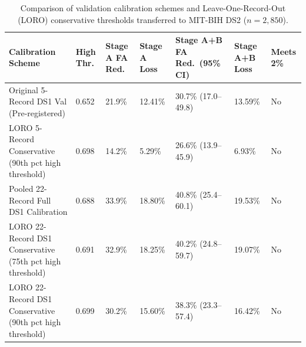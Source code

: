 \begin{table}[t]
\centering
\caption{Comparison of validation calibration schemes and Leave-One-Record-Out (LORO) conservative thresholds transferred to MIT-BIH DS2 ($n=2{,}850$).}
\label{tab:loro_calibration}
\begin{tabular}{lllllll}
\toprule
Calibration Scheme & High Thr. & Stage A FA Red. & Stage A Loss & Stage A+B FA Red.\ (95\% CI) & Stage A+B Loss & Meets 2\% \\
\midrule
Original 5-Record DS1 Val (Pre-registered) & 0.652 & 21.9\% & 12.41\% & 30.7\% (17.0--49.8) & 13.59\% & No \\
LORO 5-Record Conservative (90th pct high threshold) & 0.698 & 14.2\% & 5.29\% & 26.6\% (13.9--45.9) & 6.93\% & No \\
Pooled 22-Record Full DS1 Calibration & 0.688 & 33.9\% & 18.80\% & 40.8\% (25.4--60.1) & 19.53\% & No \\
LORO 22-Record DS1 Conservative (75th pct high threshold) & 0.691 & 32.9\% & 18.25\% & 40.2\% (24.8--59.7) & 19.07\% & No \\
LORO 22-Record DS1 Conservative (90th pct high threshold) & 0.699 & 30.2\% & 15.60\% & 38.3\% (23.3--57.4) & 16.42\% & No \\
\bottomrule
\end{tabular}
\end{table}